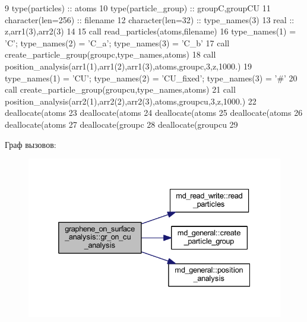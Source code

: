 \begin{DoxyCode}
9     \textcolor{keywordtype}{type}(particles)                         :: atoms
10     \textcolor{keywordtype}{type}(particle\_group)                    :: groupC,groupCU
11     \textcolor{keywordtype}{character}(len=256)                      :: filename
12     \textcolor{keywordtype}{character}(len=32)                       :: type\_names(3)
13     real                                    :: z,arr1(3),arr2(3)
14 
15     \textcolor{keyword}{call }read\_particles(atoms,filename)
16     type\_names(1) = \textcolor{stringliteral}{'C'};    type\_names(2) = \textcolor{stringliteral}{'C\_a'};      type\_names(3) = \textcolor{stringliteral}{'C\_b'}
17     \textcolor{keyword}{call }create\_particle\_group(groupc,type\_names,atoms)
18     \textcolor{keyword}{call }position\_analysis(arr1(1),arr1(2),arr1(3),atoms,groupc,3,z,1000.)
19     type\_names(1) = \textcolor{stringliteral}{'CU'};   type\_names(2) = \textcolor{stringliteral}{'CU\_fixed'}; type\_names(3) = \textcolor{stringliteral}{'#'}
20     \textcolor{keyword}{call }create\_particle\_group(groupcu,type\_names,atoms)
21     \textcolor{keyword}{call }position\_analysis(arr2(1),arr2(2),arr2(3),atoms,groupcu,3,z,1000.)
22     \textcolor{keyword}{deallocate}(atoms%
23     \textcolor{keyword}{deallocate}(atoms%
24     \textcolor{keyword}{deallocate}(atoms%
25     \textcolor{keyword}{deallocate}(atoms%
26     \textcolor{keyword}{deallocate}(atoms%
27     \textcolor{keyword}{deallocate}(groupc%
28     \textcolor{keyword}{deallocate}(groupcu%
29     
\end{DoxyCode}
Граф вызовов\+:\nopagebreak
\begin{figure}[H]
\begin{center}
\leavevmode
\includegraphics[width=332pt]{namespacegraphene__on__surface__analysis_a02cffcc8904565bfaf36c4503f30f759_cgraph}
\end{center}
\end{figure}
